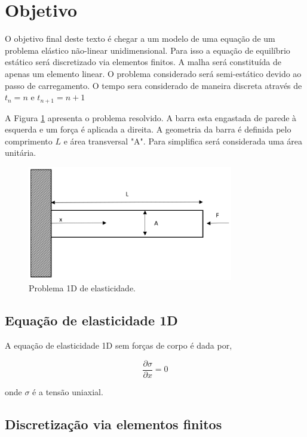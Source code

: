 \documentclass[12pt,a4paper]{article}
\newcommand{\dd}[2]{\frac{\partial #1}{\partial #2}}
\begin{document}
	
\section{Objetivo}

O objetivo final deste texto é chegar a um modelo de uma equação de um problema elástico não-linear unidimensional. Para isso a equação de equilíbrio estático será discretizado via elementos finitos. A malha será constituída de apenas um elemento linear. O problema considerado será semi-estático devido ao passo de carregamento. O tempo sera considerado de maneira discreta através de $t_n = n$ e $t_{n+1} = n+1$

A Figura \ref{fig:problema} apresenta o problema resolvido. A barra esta engastada de parede à esquerda e um força é aplicada a direita. A geometria da barra é definida pelo comprimento $L$ e área transversal "A". Para simplifica será considerada uma área unitária.

\begin{figure}[H]
	\centering
	\includegraphics[width=0.8\textwidth]{problema.PNG}
	\caption{Problema 1D de elasticidade.}
	\label{fig:problema}
\end{figure}

\subsection{Equação de elasticidade 1D}

A equação de elasticidade 1D sem forças de corpo é dada por,

\begin{equation}
	\dd{\sigma}{x} = 0
	\label{eq_equilibrio}
\end{equation}
	
\noindent
onde $\sigma$ é a tensão uniaxial.

\subsection{Discretização via elementos finitos}
\end{document}
